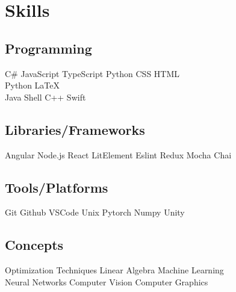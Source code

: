 \documentclass[]{plushcv}
\begin{document}
\hfill
\begin{minipage}[t]{0.25\textwidth}


    \section{Skills}
    \subsection{Programming}
    \sectionsep
    C\# \textbullet{} JavaScript \textbullet{} TypeScript
    \textbullet{} Python \textbullet{} CSS \textbullet{}
    HTML \textbullet{} \\
    \sectionsep
    Python \textbullet{} \LaTeX\ \textbullet{} \\
    \sectionsep
    Java \textbullet{}  Shell \textbullet{} C++ \textbullet{} Swift \\
    \sectionsep
    \sectionsep
    \subsection{Libraries/Frameworks}
    \sectionsep
    Angular \textbullet{} Node.js \textbullet{}
    React \textbullet{} LitElement \textbullet{}
    Eslint \textbullet{} Redux \textbullet{}
    Mocha \textbullet{} Chai
    \\
    \sectionsep
    \sectionsep
    \subsection{Tools/Platforms}
    \sectionsep
    Git \textbullet{} Github \textbullet{}
    VSCode \textbullet{}  Unix \textbullet{}
    Pytorch \textbullet{} Numpy \textbullet{}
    Unity \textbullet{} \\
    \sectionsep
    \sectionsep
    \subsection{Concepts}
    \sectionsep
    Optimization Techniques \textbullet{} Linear Algebra \textbullet{}
    Machine Learning \textbullet{} \\ Neural Networks \textbullet{}
    Computer Vision \textbullet{} Computer Graphics \textbullet{}
    \sectionsep

    \sectionsep

\end{minipage}
\end{document}

